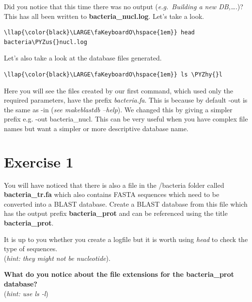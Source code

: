 \documentclass[11pt]{article}
\def\PYZus{\char`\_}
\def\PYZhy{\char`\-}
\begin{document}
    Did you notice that this time there was no output (\textit{e.g.~Building a
new DB,\ldots{}.})? This has all been written to
\textbf{bacteria\_nucl.log}. Let's take a look.

\begin{terminalinput}
\begin{Verbatim}[commandchars=\\\{\}]
\llap{\color{black}\LARGE\faKeyboardO\hspace{1em}} head bacteria\PYZus{}nucl.log
\end{Verbatim}
\end{terminalinput}

    Let's also take a look at the database files generated.

\begin{terminalinput}
\begin{Verbatim}[commandchars=\\\{\}]
\llap{\color{black}\LARGE\faKeyboardO\hspace{1em}} ls \PYZhy{}l
\end{Verbatim}
\end{terminalinput}

    Here you will see the files created by our first command, which used
only the required parameters, have the prefix \textit{bacteria.fa}. This
is because by default -out is the same as -in (\textit{see makeblastdb
--help}). We changed this by giving a simpler prefix e.g. -out
bacteria\_nucl. This can be very useful when you have complex file names
but want a simpler or more descriptive database name.

    \hypertarget{exercise-1}{%
\section{Exercise 1}\label{exercise-1}}

You will have noticed that there is also a file in the /bacteria folder
called \textbf{bacteria\_tr.fa} which also contains FASTA sequences
which need to be converted into a BLAST database. Create a BLAST
database from this file which has the output prefix
\textbf{bacteria\_prot} and can be referenced using the title
\textbf{bacteria\_prot}.

It is up to you whether you create a logfile but it is worth using
\textit{head} to check the type of sequences.\\
(\textit{hint: they might not be nucleotide}).

\textbf{What do you notice about the file extensions for the
bacteria\_prot database?}\\
(\textit{hint: use ls -l})
\end{document}
